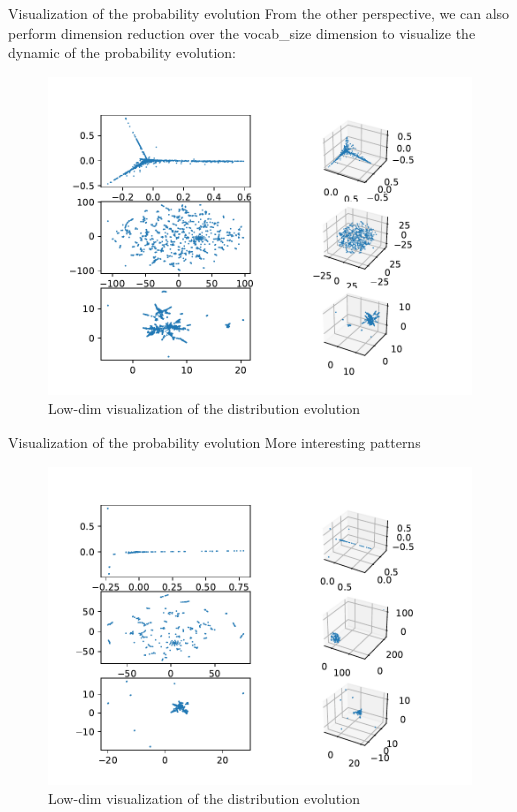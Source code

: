 \documentclass{beamer}
\begin{document}
\begin{frame}{Visualization of the probability evolution}
	From the other perspective, we can also perform dimension reduction over the vocab\_size dimension
	to visualize the dynamic of the probability evolution:
	\begin{figure}[ht]
		\centering
		\includegraphics[width=.7\textwidth]{fig/prob_evolve_0.pdf}
		\caption{Low-dim visualization of the distribution evolution}
	\end{figure}
\end{frame}

\begin{frame}{Visualization of the probability evolution}
	More interesting patterns
	\begin{figure}[ht]
		\centering
		\includegraphics[width=\textwidth]{fig/prob_evolve_1.pdf}
		\caption{Low-dim visualization of the distribution evolution}
	\end{figure}
\end{frame}
\end{document}
